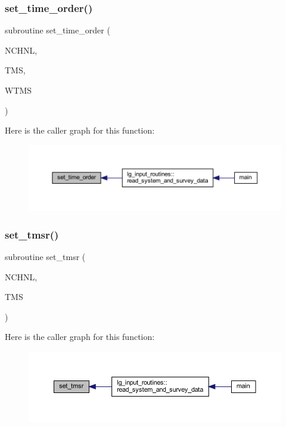 \subsubsection{\texorpdfstring{set\+\_\+time\+\_\+order()}{set\_time\_order()}}
{\footnotesize\ttfamily subroutine set\+\_\+time\+\_\+order (\begin{DoxyParamCaption}\item[{integer}]{N\+C\+H\+NL,  }\item[{real, dimension(nchnl)}]{T\+MS,  }\item[{real, dimension(nchnl)}]{W\+T\+MS }\end{DoxyParamCaption})}

Here is the caller graph for this function\+:\nopagebreak
\begin{figure}[H]
\begin{center}
\leavevmode
\includegraphics[width=350pt]{Leroi_8f90_ab7ca289c09589698d4ff1bd15e1a16e6_icgraph}
\end{center}
\end{figure}
\mbox{\label{Leroi_8f90_a404aa1badfba9369219343ec158c37ca}} 
\subsubsection{\texorpdfstring{set\+\_\+tmsr()}{set\_tmsr()}}
{\footnotesize\ttfamily subroutine set\+\_\+tmsr (\begin{DoxyParamCaption}\item[{integer}]{N\+C\+H\+NL,  }\item[{real, dimension(nchnl)}]{T\+MS }\end{DoxyParamCaption})}

Here is the caller graph for this function\+:\nopagebreak
\begin{figure}[H]
\begin{center}
\leavevmode
\includegraphics[width=350pt]{Leroi_8f90_a404aa1badfba9369219343ec158c37ca_icgraph}
\end{center}
\end{figure}
\mbox{\label{Leroi_8f90_a0cb3e794e8c12de92dbc3e157d7991c4}} 
